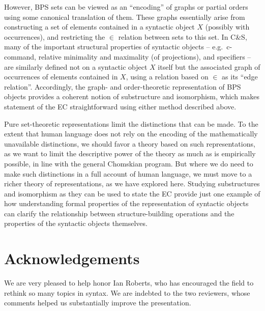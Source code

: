 \documentclass[output=paper]{langsci/langscibook}
\begin{document}
However, \gls{BPS} sets can be viewed as an \enquote{encoding} of graphs or partial
orders using some canonical translation of them. These graphs essentially arise
from constructing a set of elements contained in a syntactic object $X$
(possibly with occurrences), and restricting the $\in$ relation between sets to
this set.  In C\&S\nocite{ColSta2016}, many of the important structural
properties of syntactic objects -- e.g.\ c-command, relative minimality and
maximality (of projections), and specifiers -- are similarly defined not on a
syntactic object $X$ itself but the associated graph of occurrences of elements
contained in $X$, using a relation based on $\in$ as its ``edge relation''.
Accordingly, the graph- and order-theoretic representation of \gls{BPS} objects provides a coherent notion of substructure and
isomorphism, which makes statement of the \gls{EC}
straightforward using either method described above.

Pure set-theoretic representations limit the distinctions that can be made. To
the extent that human language does not rely on the encoding of the
mathematically unavailable distinctions, we should favor a theory based on such
representations, as we want to limit the descriptive power of the theory as
much as is empirically possible, in line with the general Chomskian program.
But where we do need to make such distinctions in a full account of human
language, we must move to a richer theory of representations, as we have
explored here. Studying substructures and isomorphism as they can be used to
state the \gls{EC} provide just one example of how understanding formal properties of
the representation of syntactic objects can clarify the relationship between
structure-building operations and the properties of the syntactic objects
themselves.

\nocite{ColSta2016}
\nocite{Chomsky2000}
\nocite{Chomsky2008}
\nocite{fukui2011merge}
\nocite{chang1990model}
\nocite{Chomsky1995}
\nocite{aczel}
\nocite{Chomsky1955}
\nocite{Chomsky1957}
\nocite{Chomsky2000}
\nocite{Chomsky1993}
\nocite{conceptions}
\nocite{lk}



\printchapterglossary{}

\section*{Acknowledgements}

We are very pleased to help honor Ian Roberts, who has encouraged the field to
rethink so many topics in syntax. We are indebted to the two reviewers, whose
comments helped us substantially improve the presentation.

{\sloppy
\printbibliography[heading=subbibliography,notkeyword=this]
}
\end{document}
